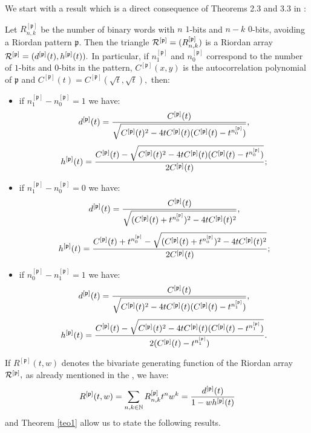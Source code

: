 We start with a result which is a direct consequence of  Theorems 2.3 and 3.3
in \cite{MS11}:
\begin{teo}
\label{teo1}
Let  $R_{n,k}^{[\mathfrak{p}]}$ be the number of binary words with $n$ $1$-bits
and $n-k$  $0$-bits, avoiding a Riordan pattern $\mathfrak{p}.$  Then the
triangle ${\cal{R}^{[\mathfrak{p}]}}=(R_{n, k}^{[\mathfrak{p}]})$ is a Riordan
array
${\cal{R}^{[\mathfrak{p}]}}=(d^{[\mathfrak{p}]}(t),h^{[\mathfrak{p}]}(t)).$ In
particular, if  $n_1^{[\mathfrak{p}]}$ and  $n_0^{[\mathfrak{p}]}$ correspond
to the number of $1$-bits  and  $0$-bits in the pattern, $C^{[\mathfrak{p}]}(x,y)$ is
the autocorrelation polynomial of $\mathfrak{p}$ and
$C^{[\mathfrak{p}]}(t)=C^{[\mathfrak{p}]}(\sqrt{t},\sqrt{t}),$ then:
\begin{itemize}

\item if $n_1^{[\mathfrak{p}]}-n_0^{[\mathfrak{p}]}=1$ we have:
$$d^{[\mathfrak{p}]}(t)={C^{[\mathfrak{p}]}(t)
\over \sqrt{C^{[\mathfrak{p}]}(t)^2-4tC^{[\mathfrak{p}]}(t)(C^{[\mathfrak{p}]}(t)-t^{n_0^{[\mathfrak{p}]}})}}, $$
$$h^{[\mathfrak{p}]}(t)={C^{[\mathfrak{p}]}(t) -\sqrt{C^{[\mathfrak{p}]}(t)^2-4tC^{[\mathfrak{p}]}(t)(C^{[\mathfrak{p}]}(t)-t^{n_0^{[\mathfrak{p}]}})}
\over 2 C^{[\mathfrak{p}]}(t)};$$

\item if $n_1^{[\mathfrak{p}]}-n_0^{[\mathfrak{p}]}=0$ we have:
$$d^{[\mathfrak{p}]}(t)={C^{[\mathfrak{p}]}(t)
\over \sqrt{( C^{[\mathfrak{p}]}(t)+t^{n_0^{[\mathfrak{p}]}})^2-4tC^{[\mathfrak{p}]}(t)^2}},$$
$$h^{[\mathfrak{p}]}(t)=
{C^{[\mathfrak{p}]}(t)+ t^{n_0^{[\mathfrak{p}]}} - \sqrt{( C^{[\mathfrak{p}]}(t)+t^{n_0^{[\mathfrak{p}]}})^2-4tC^{[\mathfrak{p}]}(t)^2}
\over 2 C^{[\mathfrak{p}]}(t)};$$

\item if $n_0^{[\mathfrak{p}]}-n_1^{[\mathfrak{p}]}=1$ we have:
$$d^{[\mathfrak{p}]}(t)={C^{[\mathfrak{p}]}(t)
\over \sqrt{C^{[\mathfrak{p}]}(t)^2-4tC^{[\mathfrak{p}]}(t)(C^{[\mathfrak{p}]}(t)-t^{n_1^{[\mathfrak{p}]}})}},$$
$$h^{[\mathfrak{p}]}(t)={C^{[\mathfrak{p}]}(t) -\sqrt{C^{[\mathfrak{p}]}(t)^2-4tC^{[\mathfrak{p}]}(t)(C^{[\mathfrak{p}]}(t)-t^{n_1^{[\mathfrak{p}]}})}
\over 2 (C^{[\mathfrak{p}]}(t)- t^{n_1^{[\mathfrak{p}]}})}.$$

\end{itemize}
\end{teo}

If $R^{[\mathfrak{p}]}(t,w)$ denotes the bivariate generating function of the
Riordan array ${\cal{R}^{[\mathfrak{p}]}},$ as already mentioned in the
, we have:
$$R^{[\mathfrak{p}]}(t,w)=\sum_{n,k\in\mathbb{N}} R_{n, k}^{[\mathfrak{p}]}t^n
w^k={d^{[\mathfrak{p}]}(t) \over 1-wh^{[\mathfrak{p}]}(t)}$$ and Theorem
\ref{teo1} allow us to state the following results.

